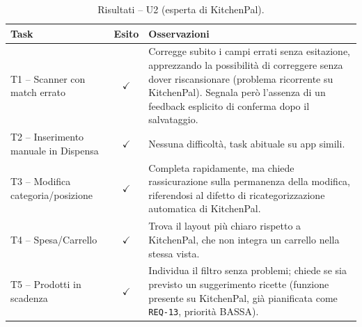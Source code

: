 \documentclass[11pt,a4paper]{article}
\begin{document}
\begin{table}[H]
\centering
\small
\renewcommand{\arraystretch}{1.3}
\begin{tabularx}{\textwidth}{>{\raggedright\arraybackslash}p{3.2cm} c >{\raggedright\arraybackslash}X}
\toprule
\textbf{Task} & \textbf{Esito} & \textbf{Osservazioni} \\
\midrule
T1 -- Scanner con match errato & {\color{greenPro}$\checkmark$} & Corregge subito i campi errati senza esitazione, apprezzando la possibilità di correggere senza dover riscansionare (problema ricorrente su KitchenPal). Segnala però l'assenza di un feedback esplicito di conferma dopo il salvataggio. \\ \addlinespace[0.4em]
T2 -- Inserimento manuale in Dispensa & {\color{greenPro}$\checkmark$} & Nessuna difficoltà, task abituale su app simili. \\ \addlinespace[0.4em]
T3 -- Modifica categoria/posizione & {\color{greenPro}$\checkmark$} & Completa rapidamente, ma chiede rassicurazione sulla permanenza della modifica, riferendosi al difetto di ricategorizzazione automatica di KitchenPal. \\ \addlinespace[0.4em]
T4 -- Spesa/Carrello & {\color{greenPro}$\checkmark$} & Trova il layout più chiaro rispetto a KitchenPal, che non integra un carrello nella stessa vista. \\ \addlinespace[0.4em]
T5 -- Prodotti in scadenza & {\color{greenPro}$\checkmark$} & Individua il filtro senza problemi; chiede se sia previsto un suggerimento ricette (funzione presente su KitchenPal, già pianificata come \texttt{REQ-13}, priorità BASSA). \\
\bottomrule
\end{tabularx}
\caption{Risultati -- U2 (esperta di KitchenPal).}
\label{tab:eval_u2}
\end{table}
\end{document}
